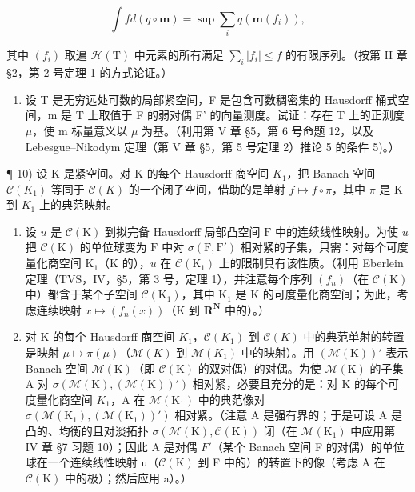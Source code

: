 \[
\int f d (q \circ \mathbf {m}) = \sup \sum_ {i} q (\mathbf {m} (f _ {i})),
\]

其中 \((f_i)\) 取遍 \(\mathcal{H}(\mathrm{T})\) 中元素的所有满足 \(\sum_{i}|f_i| \leqslant f\) 的有限序列。（按第 II 章 §2，第 2 号定理 1 的方式论证。）

\begin{enumerate}
\def\labelenumi{\arabic{enumi})}
\setcounter{enumi}{8}
\tightlist
\item
  设 T 是无穷远处可数的局部紧空间，F 是包含可数稠密集的 Hausdorff 桶式空间，m 是 T 上取值于 F 的弱对偶 F' 的向量测度。试证：存在 T 上的正测度 \(\mu\)，使 m 标量意义以 \(\mu\) 为基。（利用第 V 章 §5，第 6 号命题 12，以及 Lebesgue--Nikodym 定理（第 V 章 §5，第 5 号定理 2）推论 5 的条件 5)。）
\end{enumerate}

¶ 10) 设 K 是紧空间。对 K 的每个 Hausdorff 商空间 \(K_{1}\)，把 Banach 空间 \(\mathcal{C}(K_{1})\) 等同于 \(\mathcal{C}(K)\) 的一个闭子空间，借助的是单射 \(f \mapsto f \circ \pi\)，其中 \(\pi\) 是 K 到 \(K_{1}\) 上的典范映射。

\begin{enumerate}
\def\labelenumi{\alph{enumi})}
\item
  设 \(u\) 是 \(\mathcal{C}(\mathrm{K})\) 到拟完备 Hausdorff 局部凸空间 \(\mathrm{F}\) 中的连续线性映射。为使 \(u\) 把 \(\mathcal{C}(\mathrm{K})\) 的单位球变为 \(\mathrm{F}\) 中对 \(\sigma(\mathrm{F},\mathrm{F}')\) 相对紧的子集，只需：对每个可度量化商空间 \(\mathrm{K}_1\)（\(\mathrm{K}\) 的），\(u\) 在 \(\mathcal{C}(\mathrm{K}_1)\) 上的限制具有该性质。（利用 Eberlein 定理（TVS，IV，§5，第 3 号，定理 1），并注意每个序列 \((f_n)\)（在 \(\mathcal{C}(\mathrm{K})\) 中）都含于某个子空间 \(\mathcal{C}(\mathrm{K}_1)\)，其中 \(\mathrm{K}_1\) 是 \(\mathrm{K}\) 的可度量化商空间；为此，考虑连续映射 \(x \mapsto (f_n(x))\)（\(\mathrm{K}\) 到 \(\mathbf{R}^{\mathbf{N}}\) 中的）。）
\item
  对 K 的每个 Hausdorff 商空间 \(K_{1}\)，\(\mathcal{C}(K_{1})\) 到 \(\mathcal{C}(K)\) 中的典范单射的转置是映射 \(\mu\mapsto\pi(\mu)\)（\(\mathcal{M}(K)\) 到 \(\mathcal{M}(K_{1})\) 中的映射）。用 \((\mathcal{M}(\mathrm{K}))'\) 表示 Banach 空间 \(\mathcal{M}(\mathrm{K})\)（即 \(\mathcal{C}(\mathrm{K})\) 的双对偶）的对偶。为使 \(\mathcal{M}(\mathrm{K})\) 的子集 A 对 \(\sigma(\mathcal{M}(\mathrm{K}),(\mathcal{M}(\mathrm{K}))')\) 相对紧，必要且充分的是：对 K 的每个可度量化商空间 \(K_{1}\)，A 在 \(\mathcal{M}(\mathrm{K}_{1})\) 中的典范像对 \(\sigma(\mathcal{M}(\mathrm{K}_{1}),(\mathcal{M}(\mathrm{K}_{1}))')\) 相对紧。（注意 A 是强有界的；于是可设 A 是凸的、均衡的且对淡拓扑 \(\sigma(\mathcal{M}(\mathrm{K}),\mathcal{C}(\mathrm{K}))\) 闭（在 \(\mathcal{M}(\mathrm{K}_{1})\) 中应用第 IV 章 §7 习题 10）；因此 A 是对偶 \(F'\)（某个 Banach 空间 F 的对偶）的单位球在一个连续线性映射 u（\(\mathcal{C}(\mathrm{K})\) 到 F 中的）的转置下的像（考虑 A 在 \(\mathcal{C}(\mathrm{K})\) 中的极）；然后应用 a）。）
\end{enumerate}

